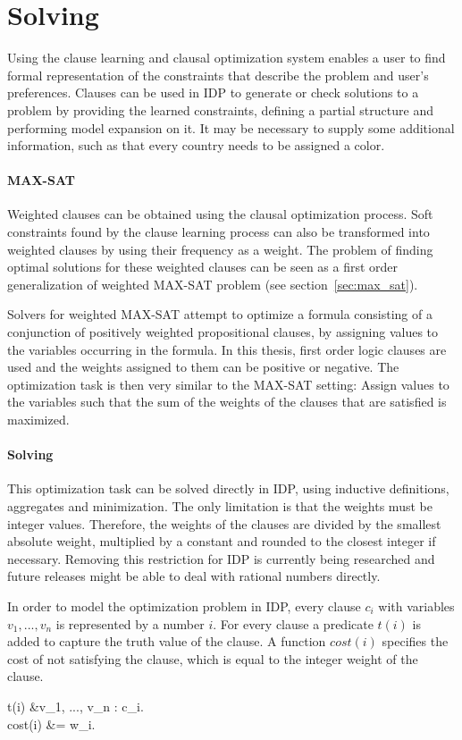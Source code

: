\section{Solving}
Using the clause learning and clausal optimization system enables a user to find formal representation of the constraints that describe the problem and user's preferences.
Clauses can be used in IDP to generate or check solutions to a problem by providing the learned constraints, defining a partial structure and performing model expansion on it.
It may be necessary to supply some additional information, such as that every country needs to be assigned a color.

\paragraph{MAX-SAT}
Weighted clauses can be obtained using the clausal optimization process.
Soft constraints found by the clause learning process can also be transformed into weighted clauses by using their frequency as a weight.
The problem of finding optimal solutions for these weighted clauses can be seen as a first order generalization of weighted MAX-SAT problem (see section~\ref{sec:max_sat}).

Solvers for weighted MAX-SAT attempt to optimize a formula consisting of a conjunction of positively weighted propositional clauses, by assigning values to the variables occurring in the formula.
In this thesis, first order logic clauses are used and the weights assigned to them can be positive or negative.
The optimization task is then very similar to the MAX-SAT setting:
Assign values to the variables such that the sum of the weights of the clauses that are satisfied is maximized.

\paragraph{Solving}
This optimization task can be solved directly in IDP, using inductive definitions, aggregates and minimization.
The only limitation is that the weights must be integer values.
Therefore, the weights of the clauses are divided by the smallest absolute weight, multiplied by a constant and rounded to the closest integer if necessary.
Removing this restriction for IDP is currently being researched and future releases might be able to deal with rational numbers directly.

In order to model the optimization problem in IDP, every clause $c_i$ with variables $v_1, ..., v_n$ is represented by a number $i$. For every clause a predicate $t(i)$ is added to capture the truth value of the clause.
A function $\mathit{cost}(i)$ specifies the cost of not satisfying the clause, which is equal to the integer weight of the clause.
\begin{shiftedflalign*}
	t(i) &\Leftrightarrow \forall v_1, ..., v_n : c_i. \\
	cost(i) &= w_i.
\end{shiftedflalign*}

